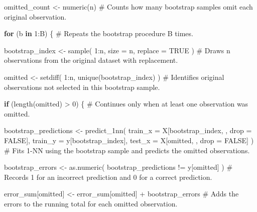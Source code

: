 \documentclass[
  letterpaper,
  DIV=11,
  numbers=noendperiod]{scrreprt}
\newenvironment{Shaded}{\begin{snugshade}}{\end{snugshade}}
\newcommand{\AttributeTok}[1]{\textcolor[rgb]{0.40,0.45,0.13}{#1}}
\newcommand{\CommentTok}[1]{\textcolor[rgb]{0.37,0.37,0.37}{#1}}
\newcommand{\ConstantTok}[1]{\textcolor[rgb]{0.56,0.35,0.01}{#1}}
\newcommand{\ControlFlowTok}[1]{\textcolor[rgb]{0.00,0.23,0.31}{\textbf{#1}}}
\newcommand{\DecValTok}[1]{\textcolor[rgb]{0.68,0.00,0.00}{#1}}
\newcommand{\FunctionTok}[1]{\textcolor[rgb]{0.28,0.35,0.67}{#1}}
\newcommand{\NormalTok}[1]{\textcolor[rgb]{0.00,0.23,0.31}{#1}}
\newcommand{\OtherTok}[1]{\textcolor[rgb]{0.00,0.23,0.31}{#1}}
\newcommand{\SpecialCharTok}[1]{\textcolor[rgb]{0.37,0.37,0.37}{#1}}
\begin{document}
\begin{Shaded}
\begin{Highlighting}[]
\NormalTok{  omitted\_count }\OtherTok{\textless{}{-}} \FunctionTok{numeric}\NormalTok{(n)}
  \CommentTok{\# Counts how many bootstrap samples omit each original observation.}

  \ControlFlowTok{for}\NormalTok{ (b }\ControlFlowTok{in} \DecValTok{1}\SpecialCharTok{:}\NormalTok{B) \{}
    \CommentTok{\# Repeats the bootstrap procedure B times.}

\NormalTok{    bootstrap\_index }\OtherTok{\textless{}{-}} \FunctionTok{sample}\NormalTok{(}
      \DecValTok{1}\SpecialCharTok{:}\NormalTok{n,}
      \AttributeTok{size =}\NormalTok{ n,}
      \AttributeTok{replace =} \ConstantTok{TRUE}
\NormalTok{    )}
    \CommentTok{\# Draws n observations from the original dataset with replacement.}

\NormalTok{    omitted }\OtherTok{\textless{}{-}} \FunctionTok{setdiff}\NormalTok{(}
      \DecValTok{1}\SpecialCharTok{:}\NormalTok{n,}
      \FunctionTok{unique}\NormalTok{(bootstrap\_index)}
\NormalTok{    )}
    \CommentTok{\# Identifies original observations not selected in this bootstrap sample.}

    \ControlFlowTok{if}\NormalTok{ (}\FunctionTok{length}\NormalTok{(omitted) }\SpecialCharTok{\textgreater{}} \DecValTok{0}\NormalTok{) \{}
      \CommentTok{\# Continues only when at least one observation was omitted.}

\NormalTok{      bootstrap\_predictions }\OtherTok{\textless{}{-}} \FunctionTok{predict\_1nn}\NormalTok{(}
        \AttributeTok{train\_x =}\NormalTok{ X[bootstrap\_index, , }\AttributeTok{drop =} \ConstantTok{FALSE}\NormalTok{],}
        \AttributeTok{train\_y =}\NormalTok{ y[bootstrap\_index],}
        \AttributeTok{test\_x =}\NormalTok{ X[omitted, , }\AttributeTok{drop =} \ConstantTok{FALSE}\NormalTok{]}
\NormalTok{      )}
      \CommentTok{\# Fits 1{-}NN using the bootstrap sample and predicts the omitted observations.}

\NormalTok{      bootstrap\_errors }\OtherTok{\textless{}{-}} \FunctionTok{as.numeric}\NormalTok{(}
\NormalTok{        bootstrap\_predictions }\SpecialCharTok{!=}\NormalTok{ y[omitted]}
\NormalTok{      )}
      \CommentTok{\# Records 1 for an incorrect prediction and 0 for a correct prediction.}

\NormalTok{      error\_sum[omitted] }\OtherTok{\textless{}{-}}
\NormalTok{        error\_sum[omitted] }\SpecialCharTok{+}\NormalTok{ bootstrap\_errors}
      \CommentTok{\# Adds the errors to the running total for each omitted observation.}


\end{Highlighting}
\end{Shaded}
\end{document}
